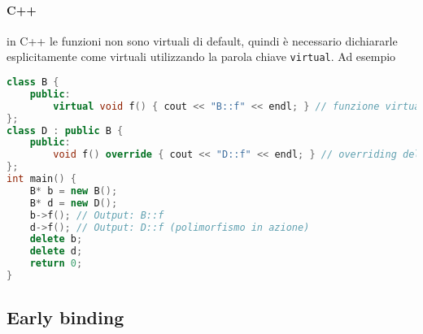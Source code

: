 \documentclass{report}
\begin{document}
\paragraph{C++}
in C++ le funzioni non sono virtuali di default, quindi è necessario dichiararle esplicitamente come virtuali utilizzando la parola chiave \texttt{virtual}. Ad esempio
\begin{lstlisting}[language=C++]
class B {
    public:
        virtual void f() { cout << "B::f" << endl; } // funzione virtuale
};  
class D : public B {
    public:
        void f() override { cout << "D::f" << endl; } // overriding della funzione virtuale
};
int main() {
    B* b = new B();
    B* d = new D();
    b->f(); // Output: B::f
    d->f(); // Output: D::f (polimorfismo in azione)
    delete b;
    delete d;
    return 0;
}
\end{lstlisting}
\subsection{Early binding}
\end{document}
